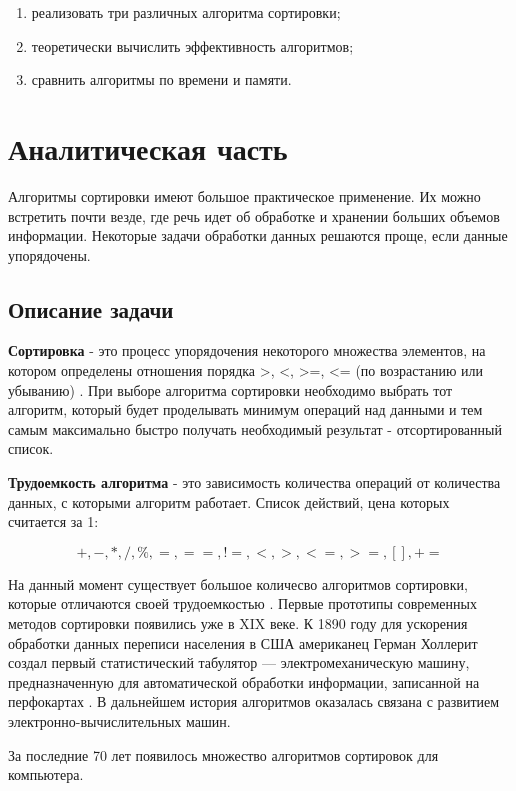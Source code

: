 \documentclass[a4paper,12pt]{article}
\begin{document}
\begin{enumerate}
    \item реализовать три различных алгоритма сортировки;
    \item теоретически вычислить эффективность алгоритмов;
    \item сравнить алгоритмы по времени и памяти.
\end{enumerate}

\newpage
\section{Аналитическая часть}

Алгоритмы сортировки имеют большое практическое применение. Их можно встретить почти везде,
где речь идет об обработке и хранении больших объемов информации. Некоторые задачи обработки
данных решаются проще, если данные упорядочены.

\subsection{Описание задачи}

\textbf{Сортировка} - это процесс упорядочения некоторого множества элементов,
на котором определены отношения порядка >, <, >=, <= (по возрастанию или убыванию) \cite{pav}.
При выборе алгоритма сортировки необходимо выбрать тот алгоритм, который будет проделывать
минимум операций над данными и тем самым максимально быстро получать необходимый результат -
отсортированный список.

\textbf{Трудоемкость алгоритма} - это зависимость количества операций от количества
данных, с которыми алгоритм работает. Список действий, цена которых считается за 1:

$$
+, -, *, /, \%, =, ==, !=, <, >, <=, >=, [], +=
$$

На данный момент существует большое количесво алгоритмов сортировки, которые отличаются
своей трудоемкостью \cite{knuth}. Первые прототипы современных методов сортировки появились уже
в XIX веке. К 1890 году для ускорения обработки данных переписи населения в США американец
Герман Холлерит создал первый статистический табулятор — электромеханическую машину,
предназначенную для автоматической обработки информации, записанной на перфокартах
\cite{eniac}.
В дальнейшем история алгоритмов оказалась связана с развитием электронно-вычислительных машин.

За последние 70 лет появилось множество алгоритмов сортировок для компьютера.\cite{knuth}
\end{document}
